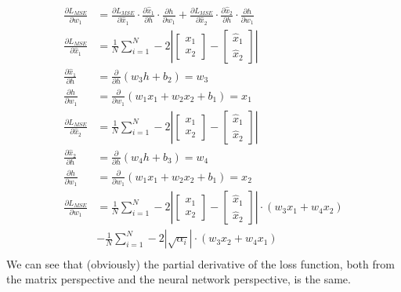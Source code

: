 \documentclass[answers,12pt,addpoints]{exam}
\begin{document}
\begin{align*}
    \frac{\partial L_{MSE}}{\partial w_1} &= \frac{\partial L_{MSE}}{\partial \hat{x}_1} \cdot \frac{\partial \hat{x}_1}{\partial h} \cdot \frac{\partial h}{\partial w_1} + \frac{\partial L_{MSE}}{\partial \hat{x}_2} \cdot \frac{\partial \hat{x}_2}{\partial h} \cdot \frac{\partial h}{\partial w_1} \\
    \frac{\partial L_{MSE}}{\partial \hat{x}_1} &= \frac{1}{N} \sum_{i=1}^{N} - 2 \left| \begin{bmatrix}
        x_1 \\
        x_2
    \end{bmatrix} - \begin{bmatrix}
        \hat{x}_1 \\
        \hat{x}_2
    \end{bmatrix} \right|\\
    \frac{\partial \hat{x}_1}{\partial h} &= \frac{\partial }{\partial h} \left( w_3h + b_2 \right) = w_3\\
    \frac{\partial h}{\partial w_1} &= \frac{\partial }{\partial w_1} \left( w_1 x_1 + w_2 x_2 + b_1 \right) = x_1\\
    \frac{\partial L_{MSE}}{\partial \hat{x}_2} &= \frac{1}{N} \sum_{i=1}^{N} - 2 \left| \begin{bmatrix}
        x_1 \\
        x_2
    \end{bmatrix} - \begin{bmatrix}
        \hat{x}_1 \\
        \hat{x}_2
    \end{bmatrix} \right|\\
    \frac{\partial \hat{x}_2}{\partial h} &= \frac{\partial }{\partial h} \left( w_4h + b_3 \right) = w_4\\
    \frac{\partial h}{\partial w_1} &= \frac{\partial }{\partial w_1} \left( w_1 x_1 + w_2 x_2 + b_1 \right) = x_2\\
    \frac{\partial L_{MSE}}{\partial w_1} &= \frac{1}{N} \sum_{i=1}^{N} - 2 \left| \begin{bmatrix}
        x_1 \\
        x_2
    \end{bmatrix} - \begin{bmatrix}
        \hat{x}_1 \\
        \hat{x}_2
    \end{bmatrix} \right| \cdot \left( w_3 x_1 + w_4 x_2 \right)\\
    &- \frac{1}{N} \sum_{i=1}^{N} - 2 \left| \sqrt{\alpha_i} \right| \cdot \left( w_3 x_2 + w_4 x_1 \right)\\
\end{align*}
We can see that (obviously) the partial derivative of the loss function, both from the matrix perspective and the neural network perspective, is the same. 
\end{document}
